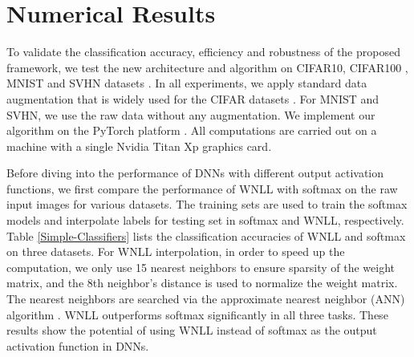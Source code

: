 \documentclass{article}
\newcommand\xmod[1]{{\textcolor{blue}{#1}}}
\begin{document}
\section{Numerical Results} \label{Experiments}
To validate the classification accuracy, efficiency and robustness of the proposed framework, we test the new architecture and algorithm on CIFAR10, CIFAR100 \cite{Cifar:2009}, MNIST\cite{MNIST:1998} and SVHN datasets \cite{SVHN:2011}.
In all experiments, we apply standard data augmentation that is widely used for the CIFAR datasets \cite{DRN:2016,Huang:2017CVPR,Zagoruyko:2016}. For MNIST and SVHN, we use the raw data without any augmentation. We implement our algorithm on the PyTorch platform \cite{paszke2017automatic}. All computations are carried out on a machine with a single Nvidia Titan Xp graphics card.



Before diving into the performance of DNNs with different output activation functions, we first compare the performance of WNLL with softmax on the raw input images for various datasets. The training sets are used to train the softmax models and interpolate labels for testing set in softmax and WNLL, respectively. Table \ref{Simple-Classifiers} lists the classification accuracies of WNLL and softmax on three datasets.
For WNLL interpolation, in order to speed up the computation, we only use 15 nearest neighbors to ensure sparsity of the weight matrix, and the 8th neighbor's distance is used to normalize the weight matrix. The nearest neighbors are searched via the approximate nearest neighbor (ANN) algorithm \cite{ANN:2014}. WNLL outperforms softmax significantly in all three tasks. These results show the potential of using WNLL instead of softmax as the output activation function in DNNs.
\end{document}
